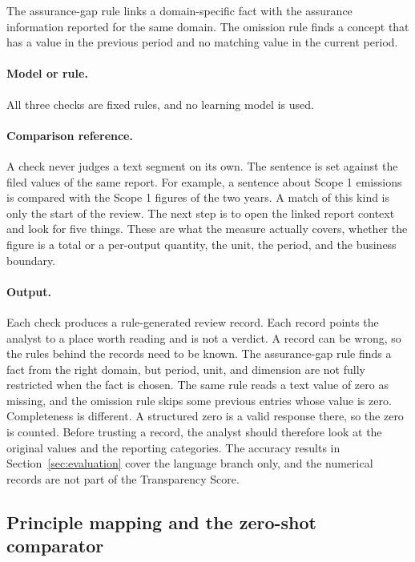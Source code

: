 The assurance-gap rule links a domain-specific fact with the assurance information reported for the same domain. The omission rule finds a concept that has a value in the previous period and no matching value in the current period.

\paragraph{Model or rule.} All three checks are fixed rules, and no learning model is used.

\paragraph{Comparison reference.} A check never judges a text segment on its own. The sentence is set against the filed values of the same report. For example, a sentence about Scope 1 emissions is compared with the Scope 1 figures of the two years. A match of this kind is only the start of the review. The next step is to open the linked report context and look for five things. These are what the measure actually covers, whether the figure is a total or a per-output quantity, the unit, the period, and the business boundary.

\paragraph{Output.} Each check produces a rule-generated review record. Each record points the analyst to a place worth reading and is not a verdict. A record can be wrong, so the rules behind the records need to be known. The assurance-gap rule finds a fact from the right domain, but period, unit, and dimension are not fully restricted when the fact is chosen. The same rule reads a text value of zero as missing, and the omission rule skips some previous entries whose value is zero. Completeness is different. A structured zero is a valid response there, so the zero is counted. Before trusting a record, the analyst should therefore look at the original values and the reporting categories. The accuracy results in Section~\ref{sec:evaluation} cover the language branch only, and the numerical records are not part of the Transparency Score.

\subsection{Principle mapping and the zero-shot comparator}
\label{sec:mapping}

